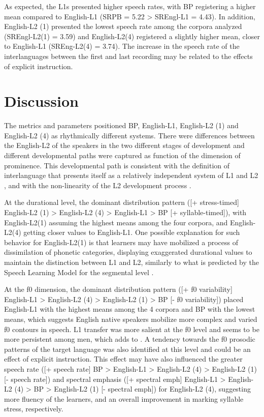 As expected, the L1s presented higher speech rates, with BP registering a
higher mean compared to English-L1 (SRPB = 5.22 > SREngl-L1 = 4.43). In
addition, English-L2 (1) presented the lowest speech rate among the corpora
analyzed (SREngl-L2(1) = 3.59) and English-L2(4) registered a slightly higher
mean, closer to English-L1 (SREng-L2(4) = 3.74). The increase in the speech
rate of the interlanguages between the first and last recording may be related
to the effects of explicit instruction.

\section{Discussion}
The metrics and parameters positioned BP, English-L1, English-L2 (1) and
English-L2 (4) as rhythmically different systems. There were differences
between the English-L2 of the speakers in the two different stages of
development and different developmental paths were captured as function of the
dimension of prominence.  This developmental path is consistent with the
definition of interlanguage that presents itself as a relatively independent
system of L1 and L2 \citep{li2014}, and with the non-linearity of the L2
development process \citep{lima2019}.

At the durational level, the dominant distribution pattern ([+ stress-timed]
English-L2 (1) > English-L2 (4) > English-L1 > BP [+ syllable-timed]), with
English-L2(1) assuming the highest means among the four corpora, and
English-L2(4) getting closer values to English-L1. One possible explanation for
such behavior for English-L2(1) is that learners may have mobilized a process
of dissimilation of phonetic categories, displaying exaggerated durational
values to maintain the distinction between L1 and L2, similarly to what is
predicted by the Speech Learning Model for the segmental level \citep{flege1995,flege2021}. %

At the f0  dimension, the dominant distribution pattern ([+ f0 variability]
English-L1 > English-L2 (4) > English-L2 (1) > BP [- f0 variability]) placed
English-L1 with the highest means among the 4 corpora and BP with the lowest
means, which suggests English native speakers mobilize more complex and varied
f0 contours in speech. L1 transfer was more salient at the f0 level and seems
to be more persistent among men, which adds to \citet{urbani2012}. A tendency
towards the f0 prosodic patterns of the target language was also identified at
this level and could be an effect of explicit instruction. This effect may have
also influenced the greater speech rate ([+ speech rate] BP > English-L1 >
English-L2 (4) > English-L2 (1) [- speech rate]) and spectral emphasis ([+
spectral emph] English-L1 > English-L2 (4) > BP > English-L2 (1) [- spectral
emph]) for English-L2 (4), suggesting more fluency of the learners, and an
overall improvement in marking syllable stress, respectively.

